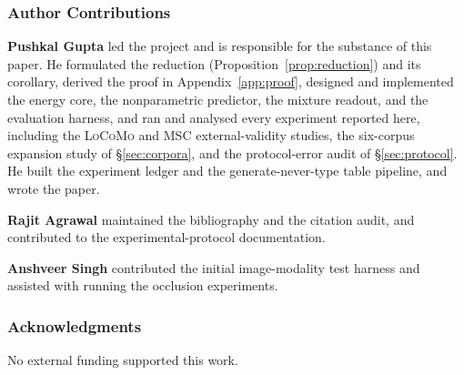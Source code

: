 \subsubsection*{Author Contributions}

\textbf{Pushkal Gupta} led the project and is responsible for the substance of this paper.
He formulated the reduction (Proposition~\ref{prop:reduction}) and its corollary, derived
the proof in Appendix~\ref{app:proof}, designed and implemented the energy core, the
nonparametric predictor, the mixture readout, and the evaluation harness, and ran and
analysed every experiment reported here, including the \textsc{LoCoMo} and \textsc{MSC}
external-validity studies, the six-corpus expansion study of \S\ref{sec:corpora}, and the
protocol-error audit of \S\ref{sec:protocol}. He built the experiment ledger
and the generate-never-type table pipeline, and wrote the paper.

\textbf{Rajit Agrawal} maintained the bibliography and the citation audit, and contributed
to the experimental-protocol documentation.

\textbf{Anshveer Singh} contributed the initial image-modality test harness and assisted
with running the occlusion experiments.

\subsubsection*{Acknowledgments}

No external funding supported this work.
